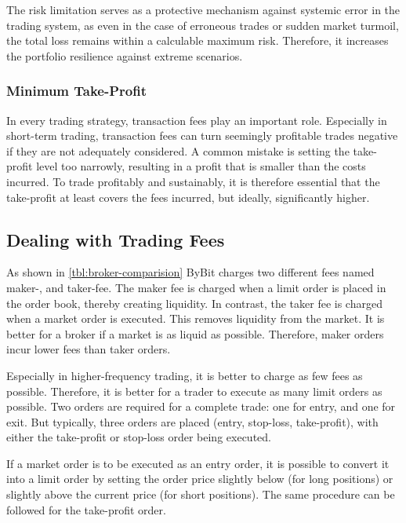 The risk limitation serves as a protective mechanism against systemic error in the trading system, as even in the case of erroneous trades or sudden market turmoil, the total loss remains within a calculable maximum risk.
Therefore, it increases the portfolio resilience against extreme scenarios.

\subsubsection{Minimum Take-Profit}

In every trading strategy, transaction fees play an important role.
Especially in short-term trading, transaction fees can turn seemingly profitable trades negative if they are not adequately considered.
A common mistake is setting the take-profit level too narrowly, resulting in a profit that is smaller than the costs incurred.
To trade profitably and sustainably, it is therefore essential that the take-profit at least covers the fees incurred, but ideally, significantly higher.

\subsection{Dealing with Trading Fees}
\label{chap:dealing-with-trading-fees}

As shown in \autoref{tbl:broker-comparision} ByBit charges two different fees named maker-, and taker-fee.
The maker fee is charged when a limit order is placed in the order book, thereby creating liquidity.
In contrast, the taker fee is charged when a market order is executed.
This removes liquidity from the market.
It is better for a broker if a market is as liquid as possible.
Therefore, maker orders incur lower fees than taker orders.

Especially in higher-frequency trading, it is better to charge as few fees as possible.
Therefore, it is better for a trader to execute as many limit orders as possible.
Two orders are required for a complete trade: one for entry, and one for exit.
But typically, three orders are placed (entry, stop-loss, take-profit), with either the take-profit or stop-loss order being executed.

If a market order is to be executed as an entry order, it is possible to convert it into a limit order by setting the order price slightly below (for long positions) or slightly above the current price (for short positions).
The same procedure can be followed for the take-profit order.

